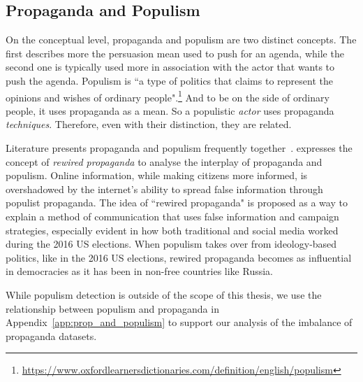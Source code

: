 \subsection{Propaganda and Populism}
\label{sec:lit_related_populism}

On the conceptual level, propaganda and populism are two distinct concepts. The first describes more the persuasion mean used to push for an agenda, while the second one is typically used more in association with the actor that wants to push the agenda. Populism is ``a type of politics that claims to represent the opinions and wishes of ordinary people".\footnote{\url{https://www.oxfordlearnersdictionaries.com/definition/english/populism}}
And to be on the side of ordinary people, it uses propaganda as a mean. So a populistic \emph{actor} uses propaganda \emph{techniques}. Therefore, even with their distinction, they are related.


Literature presents propaganda and populism frequently together~\cite{oates2021rewired,tumber2021routledge,pasquino2008populism}.
\citet{oates2021rewired} expresses the
concept of \emph{rewired propaganda} to analyse the interplay of propaganda and populism. Online information, while making citizens more informed, is overshadowed by the internet's ability to spread false information through populist propaganda.
The idea of ``rewired propaganda" is proposed as a way to explain a method of communication that uses false information and campaign strategies, especially evident in how both traditional and social media worked during the 2016 US elections.
When populism takes over from ideology-based politics, like in the 2016 US elections, rewired propaganda becomes as influential in democracies as it has been in non-free countries like Russia.

While populism detection is outside of the scope of this thesis, we use the relationship between populism and propaganda in Appendix~\ref{app:prop_and_populism} to support our analysis of the imbalance of propaganda datasets.


